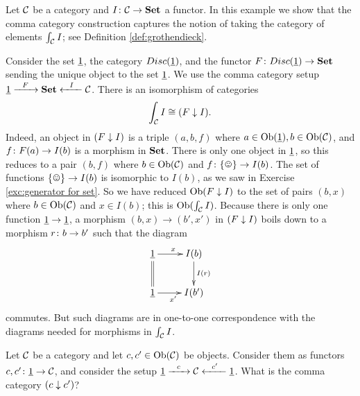 \documentclass[CT4S-EN-RU]{subfiles}
\begin{document}
\begin{exampleENG}
Let $\mathcal{C}$ be a category and $I\colon\mathcal{C}\rightarrow{\mathbf{Set}}$ a functor. In this example we show that the comma category construction captures the notion of taking the category of elements $\int_\mathcal{C} I$; see Definition \ref{def:grothendieck}. 

Consider the set $\underline{1}$, the category $Disc(\underline{1})$, and the functor $F\colon Disc(\underline{1})\rightarrow{\mathbf{Set}}$ sending the unique object to the set $\underline{1}$. We use the comma category setup $\underline{1}\xrightarrow{\ \ F\ \ }{\mathbf{Set}}\xleftarrow{\ \ I\ \ }\mathcal{C}$. There is an isomorphism of categories 
$$\int_\mathcal{C} I\cong (F\downarrow I).$$
Indeed, an object in $(F\downarrow I)$ is a triple $(a,b,f)$ where $a\in\textnormal{Ob}(\underline{1}), b\in\textnormal{Ob}(\mathcal{C})$, and $f\colon F(a)\rightarrow I(b)$ is a morphism in ${\mathbf{Set}}$. There is only one object in $\underline{1}$, so this reduces to a pair $(b,f)$ where $b\in\textnormal{Ob}(\mathcal{C})$ and $f\taking \singleton\to I(b)$. The set of functions $\singleton\to I(b)$ is isomorphic to $I(b)$, as we saw in Exercise \ref{exc:generator for set}. So we have reduced $\textnormal{Ob}(F\downarrow I)$ to the set of pairs $(b,x)$ where $b\in\textnormal{Ob}(\mathcal{C})$ and $x\in I(b)$; this is $\textnormal{Ob}(\int_\mathcal{C} I)$. Because there is only one function $\underline{1}\rightarrow\underline{1}$, a morphism $(b,x)\to(b',x')$ in $(F\downarrow I)$ boils down to a morphism $r\colon b\rightarrow b'$ such that the diagram 
$$\xymatrix{\ul{1}\ar[r]^x\ar@{=}[d]&I(b)\ar[d]^{I(r)}\\\ul{1}\ar[r]_{x'}&I(b')}$$
commutes. But such diagrams are in one-to-one correspondence with the diagrams needed for morphisms in $\int_\mathcal{C} I$.
\end{exampleENG}

\begin{exampleRUS}
\end{exampleRUS}

\begin{exerciseENG}
Let $\mathcal{C}$ be a category and let $c,c'\in\textnormal{Ob}(\mathcal{C})$ be objects. Consider them as functors $c,c'\colon\underline{1}\rightarrow\mathcal{C}$, and consider the setup $\underline{1}\xrightarrow{\ \ c\ \ }\mathcal{C}\xleftarrow{\ \ c'\ \ }\underline{1}$. What is the comma category $(c\downarrow c')$?
\end{exerciseENG}

\begin{exerciseRUS}
\end{exerciseRUS}


\subsection{}\label{sec:arithmetic of categories}
\end{document}
